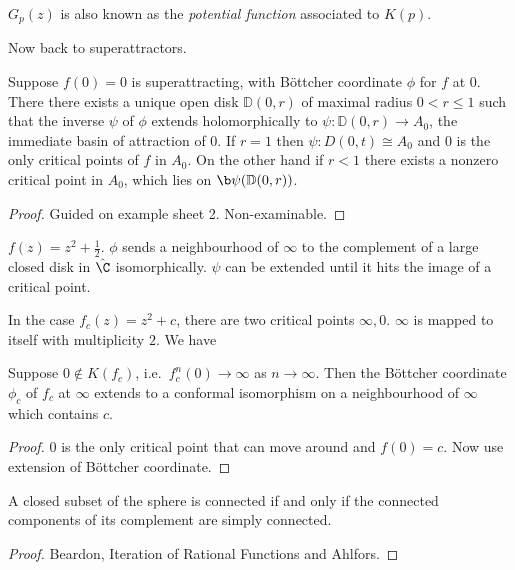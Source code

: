 \documentclass[a4paper]{article}
\newcommand{\D}{\mathbb{D}}
\begin{document}
\begin{remark}
  \(G_p(z)\) is also known as the \emph{potential function} associated to \(K(p)\).
\end{remark}

Now back to superattractors.

\begin{theorem}
  Suppose \(f(0) = 0\) is superattracting, with Böttcher coordinate \(\phi\) for \(f\) at \(0\). There there exists a unique open disk \(\D(0, r)\) of maximal radius \(0 < r \leq 1\) such that the inverse \(\psi\) of \(\phi\) extends holomorphically to \(\psi: \D(0, r) \to A_0\), the immediate basin of attraction of \(0\). If \(r = 1\) then \(\psi: D(0, t) \cong A_0\) and \(0\) is the only critical points of \(f\) in \(A_0\). On the other hand if \(r < 1\) there exists a nonzero critical point in \(A_0\), which lies on \(\b \psi(\D(0, r))\).
\end{theorem}

\begin{proof}
  Guided on example sheet 2. Non-examinable.
\end{proof}

\begin{eg}
  \(f(z) = z^2 + \frac{1}{2}\). \(\phi\) sends a neighbourhood of \(\infty\) to the complement of a large closed disk in \(\hat \C\) isomorphically. \(\psi\) can be extended until it hits the image of a critical point.
\end{eg}

In the case \(f_c(z) = z^2 + c\), there are two critical points \(\infty, 0\). \(\infty\) is mapped to itself with multiplicity \(2\). We have

\begin{corollary}
  Suppose \(0 \notin K(f_c)\), i.e.\ \(f_c^n(0) \to \infty\) as \(n \to \infty\). Then the Böttcher coordinate \(\phi_c\) of \(f_c\) at \(\infty\) extends to a conformal isomorphism on a neighbourhood of \(\infty\) which contains \(c\).
\end{corollary}

\begin{proof}
  \(0\) is the only critical point that can move around and \(f(0) = c\). Now use extension of Böttcher coordinate.
\end{proof}

\begin{proposition}
  A closed subset of the sphere is connected if and only if the connected components of its complement are simply connected.
\end{proposition}

\begin{proof}
  Beardon, Iteration of Rational Functions and Ahlfors.
\end{proof}








\printindex
\end{document}
